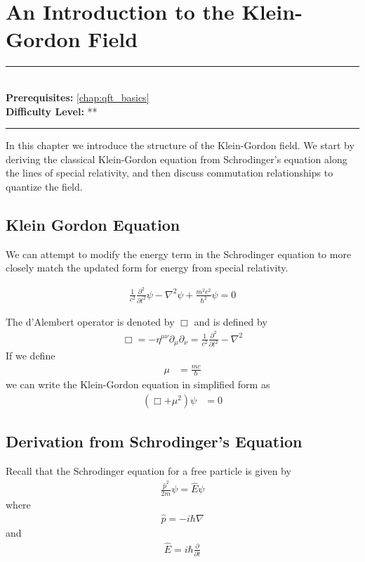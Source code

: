 \documentclass[book.tex]{subfiles}
\begin{document}
\chapter{An Introduction to the Klein-Gordon Field}

\label{chap:klein_gordon}
\noindent\rule{11cm}{0.4pt} \\
\textbf{Prerequisites:} \autoref{chap:qft_basics}  \\
\textbf{Difficulty Level:} ** \\
\noindent\rule{11cm}{0.4pt}
\vspace{5mm}


In this chapter we introduce the structure of the Klein-Gordon field. We start by deriving the classical Klein-Gordon equation from Schrodinger's equation along the lines of special relativity, and then discuss commutation relationships to quantize the field. %

\section{Klein Gordon Equation}

We can attempt to modify the energy term in the Schrodinger equation to more closely match the updated form for energy from special relativity.

\begin{align}
    \frac{1}{c^2} \frac{\partial^2}{\partial t^2} \psi - \nabla^2 \psi + \frac{m^2c^2}{\hbar^2} \psi = 0
\end{align}

The d'Alembert operator is denoted by $\Box$ and is defined by
\begin{align}
\Box = -\eta^{\mu \nu} \partial_{\mu} \partial_{\nu} = \frac{1}{c^2} \frac{\partial^2}{\partial t^2} - \nabla^2
\end{align}
If we define
\begin{align}
    \mu &= \frac{mc}{\hbar}
\end{align}
we can write the Klein-Gordon equation in simplified form as
\begin{align}
    (\Box + \mu^2) \psi &= 0
\end{align}
\section{Derivation from Schrodinger's Equation}
Recall that the Schrodinger equation for a free particle is given by
\begin{align}
    \frac{\hat{p}^2}{2m} \psi = \hat{E} \psi
\end{align}
where
\begin{align}
    \hat{p} = -i \hbar \nabla
\end{align}
and
\begin{align}
    \hat{E} = i \hbar \frac{\partial}{\partial t}
\end{align}
\end{document}
